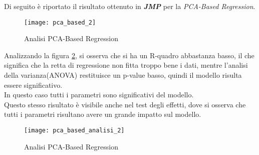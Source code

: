 Di seguito è riportato il risultato ottenuto in \textbf{\textit{JMP}} per
la \textit{PCA-Based Regression}.\\

\begin{figure}[!htbp]
  \centering
  \texttt{[image: pca\_based\_2]}
  \caption{Analisi PCA-Based Regression}
  \label{and_pca_based_2}
\end{figure}

\clearpage

Analizzando la figura \ref{and_pca_based_analisi_2}, si osserva che si ha un R-quadro
abbastanza basso, il che significa che la retta di regressione non fitta troppo
bene i dati, mentre l'analisi della varianza(ANOVA) restituisce un p-value basso,
quindi il modello risulta essere significativo.\\
In questo caso tutti i parametri sono significativi del modello.\\
Questo stesso risultato è visibile anche nel test degli effetti, dove si osserva
che tutti i parametri risultano avere un grande impatto sul modello.\\

\begin{figure}[!htbp]
  \centering
  \texttt{[image: pca\_based\_analisi\_2]}
  \caption{Analisi PCA-Based Regression}
  \label{and_pca_based_analisi_2}
\end{figure}
